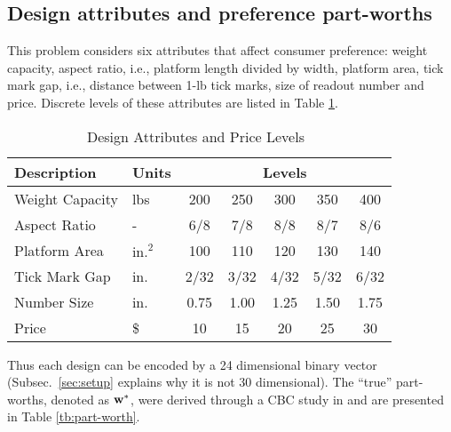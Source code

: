 \documentclass[onecolumn,11pt]{article}
\newcommand{\cutsubsectionup}{\vspace*{-0.09in}}
\newcommand{\cutsubsectionup}{}
\begin{document}
\cutsubsectionup
\subsection{Design attributes and preference part-worths}
This problem considers six attributes that affect consumer
preference: weight capacity, aspect ratio, i.e., platform length divided by width, platform area, tick mark gap, i.e., distance between 1-lb tick marks, size of readout number and price. Discrete levels of these attributes are listed in Table \ref{tb:levels}. 
\begin{table}[ht!]
\centering
\caption{Design Attributes and Price Levels~\cite{michalek2005linking}}
\label{tb:levels}
\begin{tabular}{ l l c c c c c }
\hline 
Description & Units &  \multicolumn{5}{c}{Levels} \\
\hline
Weight Capacity & lbs & 200 &
250 & 300 & 350 & 400 \\
Aspect Ratio & - & 6/8 & 7/8 & 8/8 &
8/7 & 8/6 \\
Platform Area & $\text{in.}^2$ & 100 & 110
& 120 & 130 & 140 \\
Tick Mark Gap & in. & 2/32 & 3/32 &
4/32 & 5/32 & 6/32 \\
Number Size & in. & 0.75 & 1.00 & 1.25 & 1.50
& 1.75 \\
Price & \$ & 10 & 15 & 20 & 25 & 30 \\
\hline
\end{tabular}
\end{table}
Thus each design can be encoded by a 24 dimensional binary vector (Subsec.~\ref{sec:setup} explains why it is not 30 dimensional). The ``true'' part-worths, denoted as ${\bf w}^*$, were derived through a CBC study in
\cite{michalek2005linking} and are presented in Table \ref{tb:part-worth}.
\end{document}
